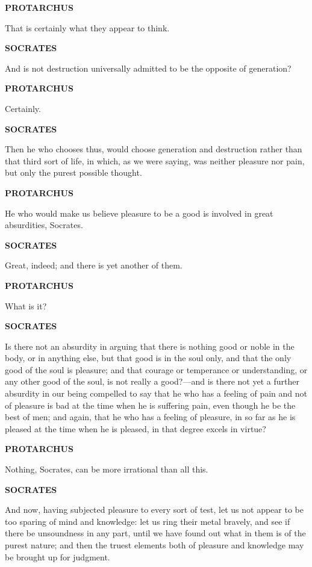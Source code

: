 \documentclass[11pt,letter]{article}
\begin{document}
\par \textbf{PROTARCHUS}
\par   That is certainly what they appear to think.

\par \textbf{SOCRATES}
\par   And is not destruction universally admitted to be the opposite of generation?

\par \textbf{PROTARCHUS}
\par   Certainly.

\par \textbf{SOCRATES}
\par   Then he who chooses thus, would choose generation and destruction rather than that third sort of life, in which, as we were saying, was neither pleasure nor pain, but only the purest possible thought.

\par \textbf{PROTARCHUS}
\par   He who would make us believe pleasure to be a good is involved in great absurdities, Socrates.

\par \textbf{SOCRATES}
\par   Great, indeed; and there is yet another of them.

\par \textbf{PROTARCHUS}
\par   What is it?

\par \textbf{SOCRATES}
\par   Is there not an absurdity in arguing that there is nothing good or noble in the body, or in anything else, but that good is in the soul only, and that the only good of the soul is pleasure; and that courage or temperance or understanding, or any other good of the soul, is not really a good?—and is there not yet a further absurdity in our being compelled to say that he who has a feeling of pain and not of pleasure is bad at the time when he is suffering pain, even though he be the best of men; and again, that he who has a feeling of pleasure, in so far as he is pleased at the time when he is pleased, in that degree excels in virtue?

\par \textbf{PROTARCHUS}
\par   Nothing, Socrates, can be more irrational than all this.

\par \textbf{SOCRATES}
\par   And now, having subjected pleasure to every sort of test, let us not appear to be too sparing of mind and knowledge:  let us ring their metal bravely, and see if there be unsoundness in any part, until we have found out what in them is of the purest nature; and then the truest elements both of pleasure and knowledge may be brought up for judgment.
\end{document}
